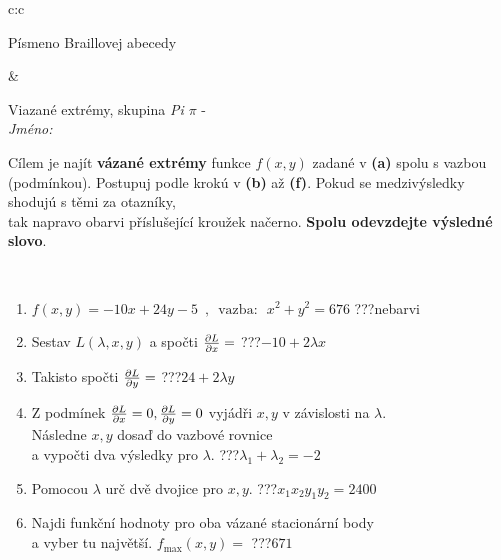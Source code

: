 \documentclass[10pt]{report}
\begin{document}
\begin{tabular}{c:c}
\begin{minipage}[c][104.5mm][t]{0.5\linewidth}
\begin{center}
\begin{minipage}{0.20\linewidth}
\begin{center}
{\small Písmeno Braillovej abecedy}
\end{center}
\end{minipage}
\end{center}
\end{minipage}
&
\begin{minipage}[c][104.5mm][t]{0.5\linewidth}
\begin{center}
\vspace{7mm}
{\huge Viazané extrémy, skupina \textit{Pi $\pi$} -}\\[5mm]
\textit{Jméno:}\phantom{xxxxxxxxxxxxxxxxxxxxxxxxxxxxxxxxxxxxxxxxxxxxxxxxxxxxxxxxxxxxxxxxx}\\[5mm]
\begin{minipage}{0.95\linewidth}
\begin{center}
Cílem je najít \textbf{vázané extrémy} funkce $f(x,y)$ zadané v \textbf{(a)} spolu s vazbou (podmínkou). Postupuj podle krokú v \textbf{(b)} až \textbf{(f)}. Pokud se medzivýsledky shodujú s těmi za otazníky,\\tak napravo obarvi příslušející kroužek načerno. \textbf{Spolu odevzdejte výsledné slovo}.
\end{center}
\end{minipage}
\\[1mm]
\begin{minipage}{0.79\linewidth}
\begin{center}
\begin{varwidth}{\linewidth}
\begin{enumerate}
\normalsize
\item $f(x,y)=-10x+24y-5 \enspace , \enspace \mathrm{vazba:} \enspace x^2+y^2=676$\quad \dotfill\; ???\;\dotfill \quad nebarvi
\item Sestav $L(\lambda,x,y)$ a spočti $\pdv{L}{x}=$\quad \dotfill\; ???\;\dotfill \quad $-10+2\lambda x$
\item Takisto spočti $\pdv{L}{y}=$\quad \dotfill\; ???\;\dotfill \quad $24+2\lambda y$
\item Z podmínek $\pdv{L}{x}=0 , \pdv{L}{y}=0$ vyjádři $x,y$ v závislosti na $\lambda$.\\ \phantom{xxxxxx}Následne $x,y$ dosaď do vazbové rovnice\\ \phantom{xxxxxx}a vypočti dva výsledky pro $\lambda$.\quad \dotfill\; ???\;\dotfill \quad $\lambda_1+\lambda_2=-2$
\item Pomocou $\lambda$ urč dvě dvojice pro $x,y$.\quad \dotfill\; ???\;\dotfill \quad $x_1 x_2 y_1 y_2=2400$
\item Najdi funkční hodnoty pro oba vázané stacionární body\\ \phantom{xxxxxx}a vyber tu najvětší. $f_{\text{max}}(x,y)=$\quad \dotfill\; ???\;\dotfill \quad $671$

\end{enumerate}
\end{varwidth}
\end{center}
\end{minipage}
\end{center}
\end{minipage}
\end{tabular}
\end{document}

